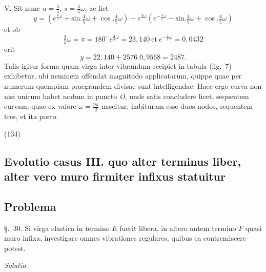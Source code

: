 \documentclass[11pt,a4paper]{article}
\begin{document}
V. Sit nunc $u = \frac{4}{5}$,  $s = \frac{4}{5}\omega$, ac fiet
\[
y = (e^{\frac{4}{5}\omega} + \text{sin.}\tfrac{4}{5}\omega + \cos.\tfrac{4}{5}\omega) - e^{2\omega}(e^{-\frac{4}{5}\omega} - \text{sin.}\tfrac{4}{5}\omega + \cos.\tfrac{4}{5}\omega)
\]
et ob
\[
\tfrac{3}{5}\omega = \pi = 180^\circ\ e^{\frac{4}{5}\omega} = 23{,}140 \ \text{et}\ e^{-\frac{4}{5}\omega} = 0{,}0432
\]
erit
\[
y = 22{,}140 + 2576.0{,}9568 = 2487.
\]
Talis igitur forma quam virga inter vibrandum recipiet in tabula (fig.~7)
 exhibetur, ubi neminem offendat magnitudo applicatarum, quippe
quae per numerum quempiam praegrandem divisae sunt intelligendae. Haec ergo curva non
nisi unicum habet nodum in puncto \emph{O}, unde satis concludere licet, sequentem
curvam, quae ex valore $\omega = \frac{9\pi}{2}$ nascitur, habituram esse duos nodos,
sequentem tres, et ita porro.

(134)

\subsection{Evolutio casus III. quo alter terminus liber, alter vero muro firmiter infixus statuitur}

\subsection{Problema}

§.~30. Si virga elastica in termino $E$ fuerit libera, in altero autem termino $F$
quasi muro infixa, investigare omnes vibrationes regulares, quibus ea contremiscere
potest.

\emph{Solutio.}
\end{document}
